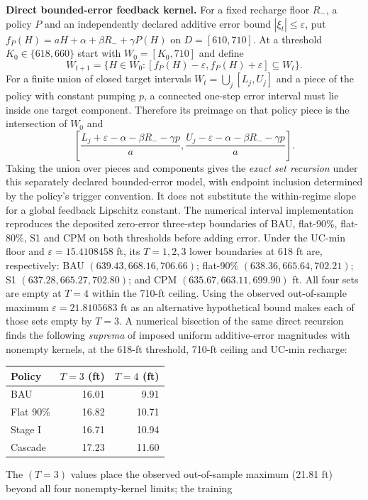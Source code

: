 \documentclass[11pt]{article}
\begin{document}
\noindent\textbf{Direct bounded-error feedback kernel.} For a fixed
recharge floor $R_-$, a policy $P$ and an independently declared
additive error bound $|\xi_t|\le\varepsilon$, put
$f_P(H)=aH+\alpha+\beta R_-+\gamma P(H)$ on $D=[610,710]$.
At a threshold $K_0\in\{618,660\}$ start with
$W_0=[K_0,710]$ and define
\[
W_{t+1}=\{H\in W_0:
[f_P(H)-\varepsilon,f_P(H)+\varepsilon]\subseteq W_t\}.
\]
For a finite union of closed target intervals $W_t=\bigcup_j[L_j,U_j]$
and a piece of the policy with constant pumping $p$, a connected
one-step error interval must lie inside one target component. Therefore
its preimage on that policy piece is the intersection of $W_0$ and
\[
\left[\frac{L_j+\varepsilon-\alpha-\beta R_--\gamma p}{a},
\frac{U_j-\varepsilon-\alpha-\beta R_--\gamma p}{a}\right].
\]
Taking the union over pieces and components gives the \emph{exact set
recursion} under this separately declared bounded-error model, with
endpoint inclusion determined by the policy's trigger convention. It
does not substitute the within-regime slope for a global feedback
Lipschitz constant. The numerical interval implementation reproduces
the deposited zero-error three-step boundaries of BAU, flat-90\%,
flat-80\%, S1 and CPM on both thresholds before adding error.
Under the UC-min floor and $\varepsilon=15.4108458$ ft, its
$T=1,2,3$ lower boundaries at 618 ft are, respectively:
BAU $(639.43,668.16,706.66)$; flat-90\%
$(638.36,665.64,702.21)$; S1 $(637.28,665.27,702.80)$; and CPM
$(635.67,663.11,699.90)$ ft. All four sets are empty at $T=4$
within the 710-ft ceiling. Using the observed out-of-sample maximum
$\varepsilon=21.8105683$ ft as an alternative hypothetical bound makes
each of those sets empty by $T=3$. A numerical bisection of the same
direct recursion finds the following \emph{suprema} of imposed uniform
additive-error magnitudes with nonempty kernels, at the 618-ft threshold,
710-ft ceiling and UC-min recharge:
\begin{center}
\begin{tabular}{lrr}
\toprule
Policy & $T=3$ (ft) & $T=4$ (ft)\\
\midrule
BAU & 16.01 & 9.91\\
Flat 90\% & 16.82 & 10.71\\
Stage I & 16.71 & 10.94\\
Cascade & 17.23 & 11.60\\
\bottomrule
\end{tabular}
\end{center}
The $(T=3)$ values place the observed out-of-sample maximum
(21.81 ft) beyond all four nonempty-kernel limits; the training
\end{document}
